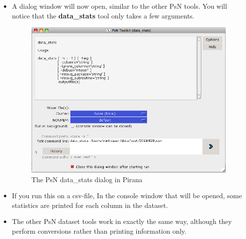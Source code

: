 \begin{itemize}
\item A dialog window will now open, similar to the other PsN tools. You
will notice that the \textbf{data\_stats} tool only takes a few
arguments. 

\begin{figure}[h] \centering
  \includegraphics[scale=.4]{images/psn_data_stats.png}
  \caption{The PsN data\_stats dialog in Pirana\label{fig:Fig5}}
\end{figure}

\item If you run this on a csv-file, In the console window that will be
opened, some statistics are printed for each column in the dataset.

\item The other PsN dataset tools work in exactly the same way, although
they perform conversions rather than printing information only.
\end{itemize}
